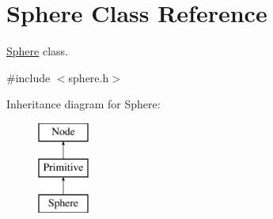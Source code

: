 \hypertarget{class_sphere}{
\section{\-Sphere \-Class \-Reference}
\label{class_sphere}
}


\hyperlink{class_sphere}{\-Sphere} class.  




{\ttfamily \#include $<$sphere.\-h$>$}

\-Inheritance diagram for \-Sphere\-:\begin{figure}[H]
\begin{center}
\leavevmode
\includegraphics[height=3.000000cm]{class_sphere}
\end{center}
\end{figure}
